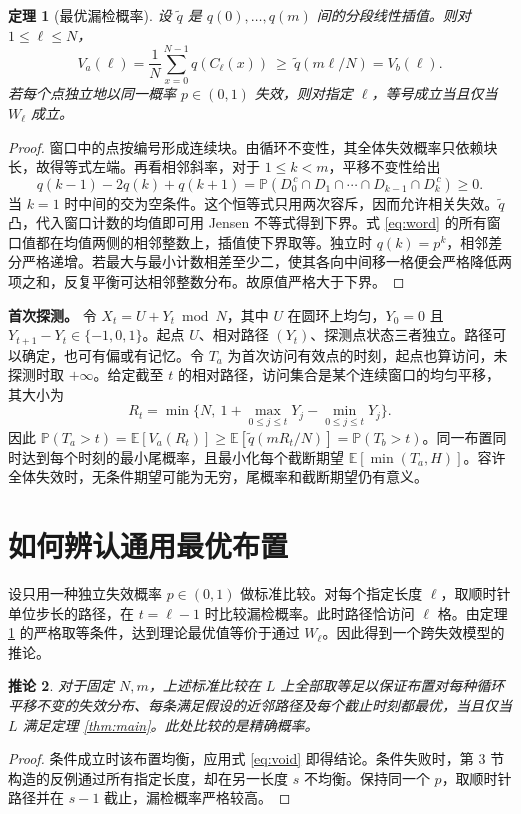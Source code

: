\documentclass[UTF8,12pt,a4paper,fontset=fandol]{ctexart}
\theoremstyle{plaincn}
\newtheorem{theorem}{定理}
\newtheorem{corollary}[theorem]{推论}
\newcommand{\E}{\mathbb E}
\newcommand{\Prob}{\mathbb P}
\newcommand{\nextsec}[1]{\clearpage\section{#1}}
\begin{document}
\begin{theorem}[最优漏检概率]\label{thm:void}
设 $\widetilde q$ 是 $q(0),\ldots,q(m)$ 间的分段线性插值。则对 $1\le\ell\le N$，
\begin{equation}
 V_a(\ell)=\frac1N\sum_{x=0}^{N-1}q(C_\ell(x))
 \ \ge\ \widetilde q(m\ell/N)=V_b(\ell).                \label{eq:void}
\end{equation}
若每个点独立地以同一概率 $p\in(0,1)$ 失效，则对指定 $\ell$，等号成立当且仅当 $W_\ell$ 成立。
\end{theorem}
\begin{proof}
窗口中的点按编号形成连续块。由循环不变性，其全体失效概率只依赖块长，故得等式左端。再看相邻斜率，对于 $1\le k<m$，平移不变性给出
\[
 q(k-1)-2q(k)+q(k+1)
 =\Prob\!\left(D_0^{\,c}\cap D_1\cap\cdots\cap D_{k-1}\cap D_k^{\,c}\right)\ge0 .
\]
当 $k=1$ 时中间的交为空条件。这个恒等式只用两次容斥，因而允许相关失效。$\widetilde q$ 凸，代入窗口计数的均值即可用 Jensen 不等式得到下界。式 \eqref{eq:word} 的所有窗口值都在均值两侧的相邻整数上，插值使下界取等。独立时 $q(k)=p^k$，相邻差分严格递增。若最大与最小计数相差至少二，使其各向中间移一格便会严格降低两项之和，反复平衡可达相邻整数分布。故原值严格大于下界。
\end{proof}

\noindent\textbf{首次探测。}
令 $X_t=U+Y_t\bmod N$，其中 $U$ 在圆环上均匀，$Y_0=0$ 且 $Y_{t+1}-Y_t\in\{-1,0,1\}$。起点 $U$、相对路径 $(Y_t)$、探测点状态三者独立。路径可以确定，也可有偏或有记忆。令 $T_a$ 为首次访问有效点的时刻，起点也算访问，未探测时取 $+\infty$。给定截至 $t$ 的相对路径，访问集合是某个连续窗口的均匀平移，其大小为
\[
 R_t=\min\{N,\ 1+\max_{0\le j\le t}Y_j-\min_{0\le j\le t}Y_j\}.
\]
因此 $\Prob(T_a>t)=\E[V_a(R_t)]\ge\E[\widetilde q(mR_t/N)]=\Prob(T_b>t)$。同一布置同时达到每个时刻的最小尾概率，且最小化每个截断期望 $\E[\min(T_a,H)]$。容许全体失效时，无条件期望可能为无穷，尾概率和截断期望仍有意义。

\nextsec{如何辨认通用最优布置}
设只用一种独立失效概率 $p\in(0,1)$ 做标准比较。对每个指定长度 $\ell$，取顺时针单位步长的路径，在 $t=\ell-1$ 时比较漏检概率。此时路径恰访问 $\ell$ 格。由定理 \ref{thm:void} 的严格取等条件，达到理论最优值等价于通过 $W_\ell$。因此得到一个跨失效模型的推论。

\begin{corollary}\label{cor:universal}
对于固定 $N,m$，上述标准比较在 $L$ 上全部取等足以保证布置对\emph{每种}循环平移不变的失效分布、\emph{每条}满足假设的近邻路径及\emph{每个}截止时刻都最优，当且仅当 $L$ 满足定理 \ref{thm:main}。此处比较的是精确概率。
\end{corollary}
\begin{proof}
条件成立时该布置均衡，应用式 \eqref{eq:void} 即得结论。条件失败时，第 3 节构造的反例通过所有指定长度，却在另一长度 $s$ 不均衡。保持同一个 $p$，取顺时针路径并在 $s-1$ 截止，漏检概率严格较高。
\end{proof}
\end{document}
